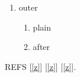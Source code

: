 \documentclass{article}
\begin{document}
\begin{enumerate}
\item outer
  \begin{enumerate}
  \item plain\label{y}
  \item[(Z)] after\label{z}
  \end{enumerate}
\end{enumerate}
REFS [\ref{z}] [\autoref{z}] [\cref{z}].
\end{document}
